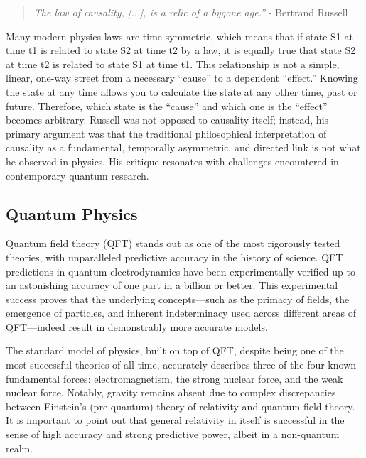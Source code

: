 \begin{quote}
    \begin{center}
            \textit{The law of causality, [...], is a relic of a bygone age.''} - Bertrand Russell
    \end{center}
\end{quote}


Many modern physics laws are time-symmetric, which means that if state S1 at time t1 is related to state S2 at time t2 by a law, it is equally true that state S2 at time t2 is related to state S1 at time t1. This relationship is not a simple, linear, one-way street from a necessary ``cause'' to a dependent ``effect.'' Knowing the state at any time allows you to calculate the state at any other time, past or future. Therefore, which state is the ``cause'' and which one is the ``effect'' becomes arbitrary. Russell was not opposed to causality itself; instead, his primary argument was that the traditional philosophical interpretation of causality as a fundamental, temporally asymmetric, and directed link is not what he observed in physics. His critique resonates with challenges encountered in contemporary quantum research.

\subsection{Quantum Physics}
\label{sec:history_quantum}

Quantum field theory\cite{peskin2018introduction} (QFT) stands out as one of the most rigorously tested theories, with unparalleled predictive accuracy in the history of science. QFT predictions in quantum electrodynamics have been experimentally verified up to an astonishing accuracy of one part in a billion or better. This experimental success proves that the underlying concepts—such as the primacy of fields, the emergence of particles, and inherent indeterminacy used across different areas of QFT—indeed result in demonstrably more accurate models.

The standard model of physics, built on top of QFT, despite being one of the most successful theories of all time, accurately describes three of the four known fundamental forces: electromagnetism, the strong nuclear force, and the weak nuclear force. Notably, gravity remains absent due to complex discrepancies between Einstein’s (pre-quantum) theory of relativity and quantum field theory. It is important to point out that general relativity in itself is successful in the sense of high accuracy and strong predictive power, albeit in a non-quantum realm.

